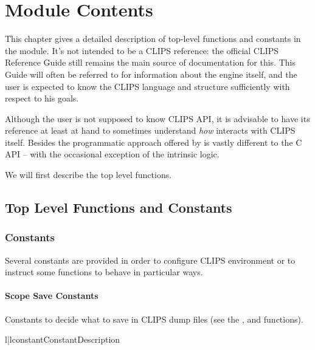 
\chapter{Module Contents\label{pyclips-modulecontents}}

This chapter gives a detailed description of top-level functions and
constants in the \pyclips{} module. It's not intended to be a CLIPS
reference: the official CLIPS Reference Guide still remains the main
source of documentation for this. This Guide will often be referred to
for information about the engine itself, and the user is expected to
know the CLIPS language and structure sufficiently with respect to his
goals.

Although the \pyclips{} user is not supposed to know CLIPS API, it is
advisable to have its reference at least at hand to sometimes understand
\emph{how} \pyclips{} interacts with CLIPS itself. Besides the programmatic
approach offered by \pyclips{} is vastly different to the C API -- with
the occasional exception of the intrinsic logic.

We will first describe the top level functions.

\section{Top Level Functions and Constants\label{pyclips-toplevel}}

\subsection{Constants\label{pyclips-tl-constants}}

Several constants are provided in order to configure CLIPS environment
or to instruct some functions to behave in particular ways.


\subsubsection{Scope Save Constants}

Constants to decide what to save in CLIPS dump files (see the
,  and
 functions).

\begin{tableii}{l|l}{constant}{Constant}{Description}
\end{tableii}


